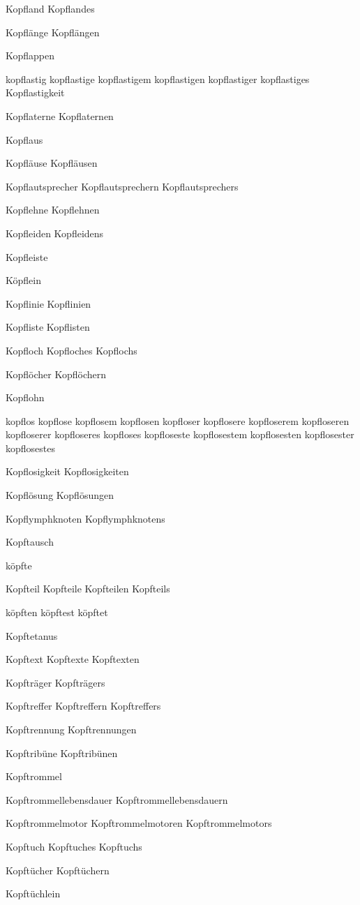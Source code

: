 Kopfland
Kopflandes

Kopflänge
Kopflängen

Kopflappen

kopflastig
kopflastige
kopflastigem
kopflastigen
kopflastiger
kopflastiges
Kopflastigkeit

Kopflaterne
Kopflaternen

Kopflaus

Kopfläuse
Kopfläusen

Kopflautsprecher
Kopflautsprechern
Kopflautsprechers

Kopflehne
Kopflehnen

Kopfleiden
Kopfleidens

Kopfleiste

Köpflein

Kopflinie
Kopflinien

Kopfliste
Kopflisten

Kopfloch
Kopfloches
Kopflochs

Kopflöcher
Kopflöchern

Kopflohn

kopflos
kopflose
kopflosem
kopflosen
kopfloser
kopflosere
kopfloserem
kopfloseren
kopfloserer
kopfloseres
kopfloses
kopfloseste
kopflosestem
kopflosesten
kopflosester
kopflosestes

Kopflosigkeit
Kopflosigkeiten

Kopflösung
Kopflösungen

Kopflymphknoten
Kopflymphknotens

Kopftausch

köpfte

Kopfteil
Kopfteile
Kopfteilen
Kopfteils

köpften
köpftest
köpftet

Kopftetanus

Kopftext
Kopftexte
Kopftexten

Kopfträger
Kopfträgers

Kopftreffer
Kopftreffern
Kopftreffers

Kopftrennung
Kopftrennungen

Kopftribüne
Kopftribünen

Kopftrommel

Kopftrommellebensdauer
Kopftrommellebensdauern

Kopftrommelmotor
Kopftrommelmotoren
Kopftrommelmotors


Kopftuch
Kopftuches
Kopftuchs

Kopftücher
Kopftüchern

Kopftüchlein

